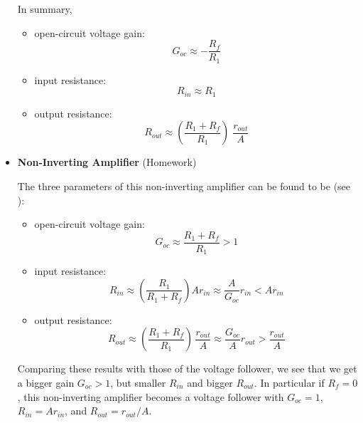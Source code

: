 \documentclass{article}
\begin{document}
\begin{itemize}
\begin{itemize}
\begin{itemize}
      \end{itemize}
  \end{itemize}

  In summary,
  \begin{itemize}
  \item open-circuit voltage gain:
    \begin{equation}
      G_{oc}\approx -\frac{R_f}{R_1}
    \end{equation}
  \item input resistance:
    \begin{equation}
      R_{in}\approx R_1
    \end{equation}
  \item output resistance:
    \begin{equation}
      R_{out}\approx \left(\frac{R_1+R_f}{R_1}\right)\;\frac{r_{out}}{A}
    \end{equation}
  \end{itemize}


\item {\bf Non-Inverting Amplifier} (Homework)


  The three parameters of this non-inverting amplifier can be found 
  to be (see 
  ):
  \begin{itemize}
    \item open-circuit voltage gain:
      \begin{equation}
        G_{oc} \approx \frac{R_1+R_f}{R_1}>1
      \end{equation}
    \item input resistance:
      \begin{equation}
        R_{in} \approx \left(\frac{R_1}{R_1+R_f}\right)A r_{in}
        \approx\frac{A}{G_{oc}}r_{in}<A r_{in}
      \end{equation}
    \item output resistance:
      \begin{equation}
        R_{out}\approx \left(\frac{R_1+R_f}{R_1} \right)\,\frac{r_{out}}{A} 
        \approx\frac{G_{oc}}{A}r_{out}>\frac{r_{out}}{A}
      \end{equation}
  \end{itemize}
  Comparing these results with those of the voltage follower, we see 
  that we get a bigger gain $G_{oc}>1$, but smaller $R_{in}$ and bigger
  $R_{out}$. In particular if $R_f=0$, this non-inverting amplifier
  becomes a voltage follower with $G_{oc}=1$, $R_{in}=Ar_{in}$, and
  $R_{out}=r_{out}/A$.

\end{itemize}
\end{document}
